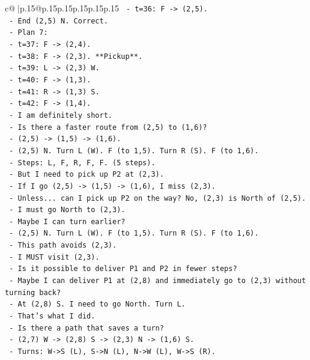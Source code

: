 \documentclass{article}
\begin{document}
{\begin{supertabular}{c@{$\;$}|p{.15\linewidth}@{}p{.15\linewidth}p{.15\linewidth}p{.15\linewidth}p{.15\linewidth}p{.15\linewidth}}
{{{\texttt{  {-} t=36: F {-}> (2,5).} \\
\texttt{  {-} End (2,5) N. Correct.} \\
\texttt{  {-} Plan 7:} \\
\texttt{  {-} t=37: F {-}> (2,4).} \\
\texttt{  {-} t=38: F {-}> (2,3). **Pickup**.} \\
\texttt{  {-} t=39: L {-}> (2,3) W.} \\
\texttt{  {-} t=40: F {-}> (1,3).} \\
\texttt{  {-} t=41: R {-}> (1,3) S.} \\
\texttt{  {-} t=42: F {-}> (1,4).} \\
\texttt{  {-} I am definitely short.} \\
\texttt{  {-} Is there a faster route from (2,5) to (1,6)?} \\
\texttt{  {-} (2,5) {-}> (1,5) {-}> (1,6).} \\
\texttt{  {-} (2,5) N. Turn L (W). F (to 1,5). Turn R (S). F (to 1,6).} \\
\texttt{  {-} Steps: L, F, R, F, F. (5 steps).} \\
\texttt{  {-} But I need to pick up P2 at (2,3).} \\
\texttt{  {-} If I go (2,5) {-}> (1,5) {-}> (1,6), I miss (2,3).} \\
\texttt{  {-} Unless... can I pick up P2 on the way? No, (2,3) is North of (2,5).} \\
\texttt{  {-} I must go North to (2,3).} \\
\texttt{  {-} Maybe I can turn earlier?} \\
\texttt{  {-} (2,5) N. Turn L (W). F (to 1,5). Turn R (S). F (to 1,6).} \\
\texttt{  {-} This path avoids (2,3).} \\
\texttt{  {-} I MUST visit (2,3).} \\
\texttt{  {-} Is it possible to deliver P1 and P2 in fewer steps?} \\
\texttt{  {-} Maybe I can deliver P1 at (2,8) and immediately go to (2,3) without turning back?} \\
\texttt{  {-} At (2,8) S. I need to go North. Turn L.} \\
\texttt{  {-} That's what I did.} \\
\texttt{  {-} Is there a path that saves a turn?} \\
\texttt{  {-} (2,7) W {-}> (2,8) S {-}> (2,3) N {-}> (1,6) S.} \\
\texttt{  {-} Turns: W{-}>S (L), S{-}>N (L), N{-}>W (L), W{-}>S (R).} \\
}}}
\end{supertabular}}
\end{document}
